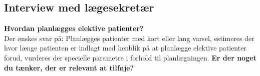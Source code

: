 \subsection{Interview med lægesekretær}
\textbf{Hvordan planlægges elektive patienter?} \\
\noindent
Der ønskes svar på: Planlægges patienter med kort eller lang varsel, estimeres der hvor længe patienten er indlagt med henblik på at planlægge elektive patienter forud, vurderes der specielle parametre i forhold til planlægningen. 
\noindent
\textbf{Er der noget du tænker, der er relevant at tilføje?} \\





